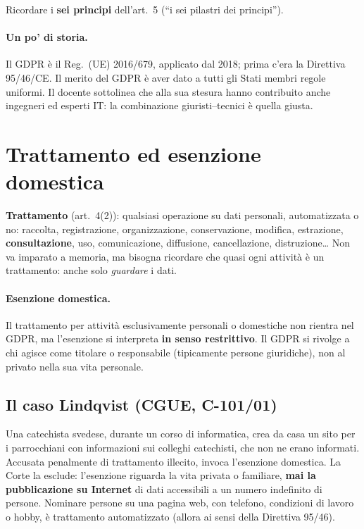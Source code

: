 \begin{esame}
Ricordare i \textbf{sei principi} dell'art.~5 (``i sei pilastri dei principi'').
\end{esame}

\paragraph{Un po' di storia.} Il GDPR è il Reg.~(UE) 2016/679, applicato dal 2018; prima c'era la
Direttiva 95/46/CE. Il merito del GDPR è aver dato a tutti gli Stati membri regole uniformi. Il
docente sottolinea che alla sua stesura hanno contribuito anche ingegneri ed esperti IT: la
combinazione giuristi--tecnici è quella giusta.

\section{Trattamento ed esenzione domestica}
\textbf{Trattamento} (art.~4(2)): qualsiasi operazione su dati personali, automatizzata o no:
raccolta, registrazione, organizzazione, conservazione, modifica, estrazione, \textbf{consultazione},
uso, comunicazione, diffusione, cancellazione, distruzione\ldots{} Non va imparato a memoria, ma
bisogna ricordare che quasi ogni attività è un trattamento: anche solo \emph{guardare} i dati.

\paragraph{Esenzione domestica.} Il trattamento per attività esclusivamente personali o domestiche
non rientra nel GDPR, ma l'esenzione si interpreta \textbf{in senso restrittivo}. Il GDPR si rivolge a
chi agisce come titolare o responsabile (tipicamente persone giuridiche), non al privato nella sua
vita personale.

\subsection{Il caso Lindqvist (CGUE, C-101/01)}
Una catechista svedese, durante un corso di informatica, crea da casa un sito per i parrocchiani con
informazioni sui colleghi catechisti, che non ne erano informati. Accusata penalmente di trattamento
illecito, invoca l'esenzione domestica. La Corte la esclude: l'esenzione riguarda la vita privata o
familiare, \textbf{mai la pubblicazione su Internet} di dati accessibili a un numero indefinito di
persone. Nominare persone su una pagina web, con telefono, condizioni di lavoro o hobby, è
trattamento automatizzato (allora ai sensi della Direttiva 95/46).

